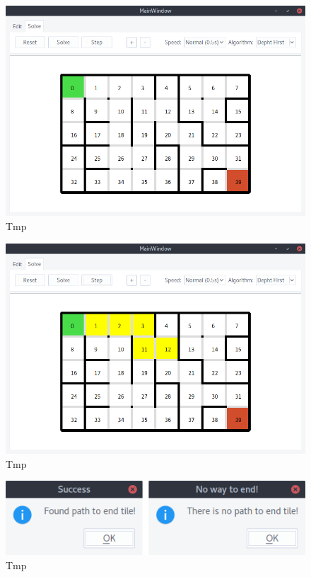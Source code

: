 \documentclass[12pt,a4paper]{article}
\begin{document}
	\begin{figure}[H]
		\centering
		\includegraphics[width=0.8\linewidth]{obrazki/5.png}
		\caption{Tmp}
	\end{figure}
	
	\begin{figure}[H]
		\centering
		\includegraphics[width=0.8\linewidth]{obrazki/6.png}
		\caption{Tmp}
	\end{figure}
	
	\begin{figure}[H]
		\centering
		\includegraphics[width=0.8\linewidth]{obrazki/7i8.png}
		\caption{Tmp}
	\end{figure}
	
\end{document}
